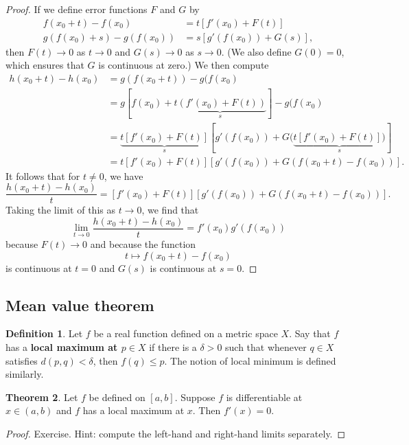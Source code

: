 \documentclass[12pt]{article}
\theoremstyle{definition}
\newtheorem{definition}{Definition}
\theoremstyle{theorem}
\newtheorem{theorem}[definition]{Theorem}
\begin{document}
\begin{proof}
If we define error functions $F$ and $G$ by 
\begin{align*}
f(x_0 + t) - f(x_0) &= t[f'(x_0) + F(t)] \\
g(f(x_0) + s) - g(f(x_0)) &= s[g'(f(x_0)) + G(s)],
\end{align*}
then $F(t) \to 0$ as $t \to 0$ and $G(s) \to 0$ as $s \to 0$. (We also define $G(0) = 0$, which ensures that $G$ is continuous at zero.) We then compute 
\begin{align*}
h(x_0 + t) - h(x_0) &= g(f(x_0 + t)) - g(f(x_0) \\
&= g[f(x_0) + \underbrace{t(f'(x_0) + F(t))}_{s}] - g(f(x_0) \\
&= \underbrace{t[f'(x_0) + F(t)]}_{s}[g'(f(x_0)) + G(\underbrace{t[f'(x_0) + F(t)])}_{s}] \\
&= t[f'(x_0) + F(t)][g'(f(x_0)) + G(f(x_0 + t) - f(x_0))].
\end{align*}
It follows that for $t \ne 0$, we have 
\[
\frac{h(x_0 + t) - h(x_0)}{t} = [f'(x_0) + F(t)][g'(f(x_0)) + G(f(x_0 + t) - f(x_0))].
\]
Taking the limit of this as $t \to 0$, we find that  
\[
\lim_{t\to 0} \frac{h(x_0 + t) - h(x_0)}{t} = f'(x_0) g'(f(x_0))
\]
because $F(t) \to 0$ and because the function
\[
t \mapsto f(x_0 + t) -f(x_0)
\]
is continuous at $t =0$ and $G(s)$ is continuous at $s = 0$. 
\end{proof}

\subsection{Mean value theorem}

\begin{definition}
Let $f$ be a real function defined on a metric space $X$. Say that $f$ has a \textbf{local maximum at $p \in X$} if there is a $\delta > 0$ such that whenever $q \in X$ satisfies $d(p,q) < \delta$, then $f(q) \leqslant p$. The notion of local minimum is defined similarly. 
\end{definition}

\begin{theorem}
Let $f$ be defined on $[a,b]$. Suppose $f$ is differentiable at $x \in (a,b)$ and $f$ has a local maximum at $x$. Then $f'(x) = 0$. 
\end{theorem}

\begin{proof}
Exercise. Hint: compute the left-hand and right-hand limits separately. 
\end{proof}
\end{document}
